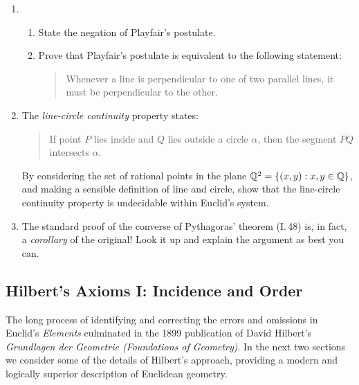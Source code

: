 \begin{exercises}
\begin{enumerate}
	  
	  \item\begin{enumerate}
	    \item State the negation of Playfair's postulate.
	    \item Prove that Playfair's postulate is equivalent to the following statement:
	 	 	\begin{quote}
	  		Whenever a line is perpendicular to one of two parallel lines, it must be perpendicular to the other.
	  	\end{quote}
	  \end{enumerate}
	 
	  
	  \item\label{ex:euclidundecideable} The \emph{line-circle continuity} property states:
	  \begin{quote}
	  	If point $P$ lies inside and $Q$ lies outside a circle $\alpha$, then the segment $\overline{PQ}$ intersects $\alpha$.
	  \end{quote}
	  By considering the set of rational points in the plane $\mathbb{Q}^2=\{(x,y):x,y\in\mathbb{Q}\}$, and making a sensible definition of line and circle, show that the line-circle continuity property is undecidable within Euclid's system.
		
		
		\item The standard proof of the converse of Pythagoras' theorem (I.\,48) is, in fact, a \emph{corollary} of the original! Look it up and explain the argument as best you can.
	\end{enumerate}
	
\end{exercises}

\clearpage



\subsection{Hilbert's Axioms I: Incidence and Order}\label{sec:hilbert1}

The long process of identifying and correcting the errors and omissions in Euclid's \emph{Elements} culminated in the 1899 publication of David Hilbert's \emph{Grundlagen der Geometrie (Foundations of Geometry)}. In the next two sections we consider some of the details of Hilbert's approach, providing a modern and logically superior description of Euclidean geometry.\smallbreak


